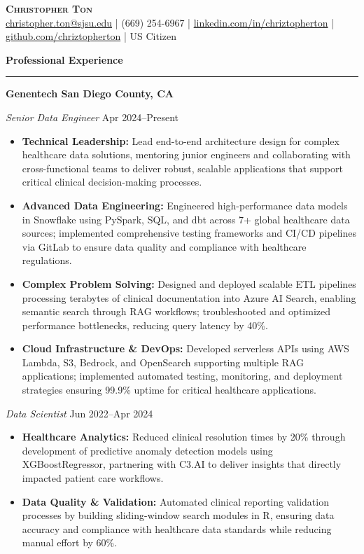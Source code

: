 \documentclass[letterpaper,10pt]{article}
\newcommand{\resumesection}[1]{
  \vspace{4pt}
  \noindent\textbf{\Large #1} \\
  \noindent\rule{\linewidth}{0.2pt}
  \vspace{-4pt}
}
\begin{document}
\begin{center}
    \textbf{\Huge \scshape Christopher Ton} \\
    \href{mailto:christopher.ton@sjsu.edu}{christopher.ton@sjsu.edu} | (669) 254-6967 | \href{https://linkedin.com/in/chriztopherton/}{linkedin.com/in/chriztopherton} | \href{https://github.com/chriztopherton}{github.com/chriztopherton} | US Citizen
\end{center}

\resumesection{Professional Experience}

\textbf{Genentech \hfill San Diego County, CA}\par
\textit{Senior Data Engineer} \hfill Apr 2024--Present
\begin{itemize}[leftmargin=0.15in, itemsep=0pt, parsep=0pt, topsep=0pt]
    \item \textbf{Technical Leadership:} Lead end-to-end architecture design for complex healthcare data solutions, mentoring junior engineers and collaborating with cross-functional teams to deliver robust, scalable applications that support critical clinical decision-making processes.
    \item \textbf{Advanced Data Engineering:} Engineered high-performance data models in Snowflake using PySpark, SQL, and dbt across 7+ global healthcare data sources; implemented comprehensive testing frameworks and CI/CD pipelines via GitLab to ensure data quality and compliance with healthcare regulations.
    \item \textbf{Complex Problem Solving:} Designed and deployed scalable ETL pipelines processing terabytes of clinical documentation into Azure AI Search, enabling semantic search through RAG workflows; troubleshooted and optimized performance bottlenecks, reducing query latency by 40\%.
    \item \textbf{Cloud Infrastructure \& DevOps:} Developed serverless APIs using AWS Lambda, S3, Bedrock, and OpenSearch supporting multiple RAG applications; implemented automated testing, monitoring, and deployment strategies ensuring 99.9\% uptime for critical healthcare applications.
\end{itemize}

\textit{Data Scientist} \hfill Jun 2022--Apr 2024
\begin{itemize}[leftmargin=0.15in, itemsep=0pt, parsep=0pt, topsep=0pt]
    \item \textbf{Healthcare Analytics:} Reduced clinical resolution times by 20\% through development of predictive anomaly detection models using XGBoostRegressor, partnering with C3.AI to deliver insights that directly impacted patient care workflows.
    \item \textbf{Data Quality \& Validation:} Automated clinical reporting validation processes by building sliding-window search modules in R, ensuring data accuracy and compliance with healthcare data standards while reducing manual effort by 60\%.
\end{itemize}
\end{document}
